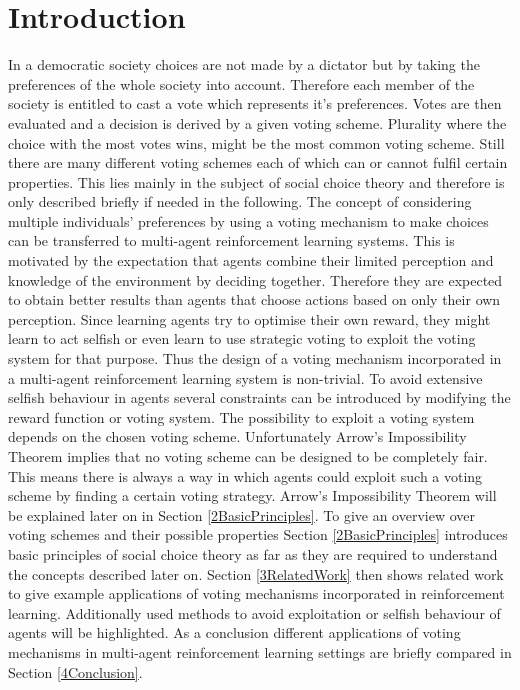 \documentclass[conference]{IEEEtran}
\begin{document}
\section{Introduction}
In a democratic society choices are not made by a dictator but by taking the preferences of the whole society into account. Therefore each member of the society is entitled to cast a vote which represents it's preferences. Votes are then evaluated and a decision is derived by a given voting scheme. Plurality where the choice with the most votes wins, might be the most common voting scheme. Still there are many different voting schemes each of which can or cannot fulfil certain properties. This lies mainly in the subject of social choice theory and therefore is only described briefly if needed in the following.
\newline
The concept of considering multiple individuals' preferences by using a voting mechanism to make choices can be transferred to multi-agent reinforcement learning systems. This is motivated by the expectation that agents combine their limited perception and knowledge of the environment by deciding together. Therefore they are expected to obtain better results than agents that choose actions based on only their own perception.\cite{partalas2008hybrid}
\newline
Since learning agents try to optimise their own reward, they might learn to act selfish\cite{carr2008peer} or even learn to use strategic voting to exploit the voting system\cite{pitt2006voting} for that purpose.
Thus the design of a voting mechanism incorporated in a multi-agent reinforcement learning system is non-trivial.
To avoid extensive selfish behaviour in agents several constraints can be introduced by modifying the reward function or voting system.
The possibility to exploit a voting system depends on the chosen voting scheme.
Unfortunately Arrow's Impossibility Theorem implies that no voting scheme can be designed to be completely fair. This means there is always a way in which agents could exploit such a voting scheme by finding a certain voting strategy. Arrow's Impossibility Theorem will be explained later on in Section \ref{2BasicPrinciples}.
\newline
To give an overview over voting schemes and their possible properties Section \ref{2BasicPrinciples} introduces basic principles of social choice theory as far as they are required to understand the concepts described later on.
Section \ref{3RelatedWork} then shows related work to give example  applications of voting mechanisms incorporated in reinforcement learning.
Additionally used methods to avoid exploitation or selfish behaviour of agents will be highlighted.
As a conclusion different applications of voting mechanisms in multi-agent reinforcement learning settings are briefly compared in Section \ref{4Conclusion}.
\end{document}
